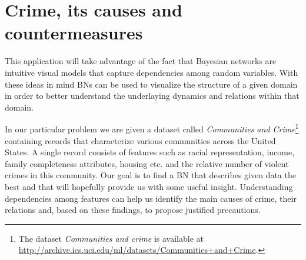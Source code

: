 \documentclass[english,cover]{fitthesis} %
\newcommand{\term}[1]{\emph{#1}}           %
\newcommand{\todo}[1]{{\color{red}#1}}
\begin{document}





\section{Crime, its causes and countermeasures}\label{ch:practical_crime}
This application will take advantage of the fact that Bayesian networks are intuitive visual models that capture dependencies among random variables. With these ideas in mind BNs can be used to visualize the structure of a given domain in order to better understand the underlaying dynamics and relations within that domain.

In our particular problem we are given a dataset called \term{Communities and Crime}\footnote{The dataset \emph{Communities and crime} is available at \url{http://archive.ics.uci.edu/ml/datasets/Communities+and+Crime}.} containing records that characterize various communities across the United States. A single record consists of features such as racial representation, income, family completeness attributes, housing etc. and the relative number of violent crimes in this community. Our goal is to find a BN that describes given data the best and that will hopefully provide us with some useful insight. Understanding dependencies among features can help us identify the main causes of crime, their relations and, based on these findings, to propose justified precautions.
\end{document}
